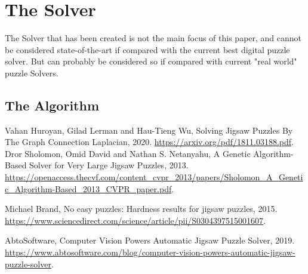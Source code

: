 \documentclass{article}
\begin{document}
\section{The Solver}
The Solver that has been created is not the main focus of this paper,
and cannot be considered state-of-the-art if compared with the current best
digital puzzle solver. But can probably be considered so if compared with current
"real world" puzzle Solvers.

\subsection{The Algorithm}


\clearpage
\begin{thebibliography}{9}

    Vahan Huroyan, Gilad   Lerman and Hau-Tieng Wu,
    Solving Jigsaw Puzzles By The Graph Connection Laplacian,
    2020.
    \url{https://arxiv.org/pdf/1811.03188.pdf}.
    Dror Sholomon, Omid David and Nathan S. Netanyahu,
    A Genetic Algorithm-Based Solver for Very Large Jigsaw Puzzles,
    2013.
    \url{https://openaccess.thecvf.com/content_cvpr_2013/papers/Sholomon_A_Genetic_Algorithm-Based_2013_CVPR_paper.pdf}.
  
    Michael Brand,
    No easy puzzles: Hardness results for jigsaw puzzles,
    2015.
    \url{https://www.sciencedirect.com/science/article/pii/S0304397515001607}.

    AbtoSoftware,
    Computer Vision Powers Automatic Jigsaw Puzzle Solver,
    2019.
    \url{https://www.abtosoftware.com/blog/computer-vision-powers-automatic-jigsaw-puzzle-solver}.
  
\end{thebibliography}
\end{document}

